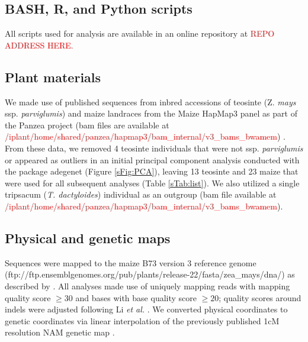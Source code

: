\documentclass{pnastwo}
\begin{document}
\begin{article}
\begin{materials}

  \subsection{BASH, R, and Python scripts}
All scripts used for analysis are available in an online repository at \textcolor{red}{REPO ADDRESS HERE.} 

\subsection{Plant materials}
We made use of published sequences from inbred accessions of teosinte (Z. \emph{mays} ssp. \emph{parviglumis}) and maize landraces from the Maize HapMap3 panel as part of the Panzea project (bam files are available at \textcolor{red}{/iplant/home/shared/panzea/hapmap3/bam\_internal/v3\_bams\_bwamem}) \cite{chia2012, lemmon2014,hapmap3}. 
From these data, we removed 4 teosinte individuals that were not ssp. \emph{parviglumis} or appeared as outliers in an initial principal component analysis conducted with the package adegenet \cite{jombart2011} (Figure \ref{sFig:PCA}), leaving 13 teosinte and 23 maize that were used for all subsequent analyses (Table \ref{sTab:list}). We also utilized a single tripsacum (\emph{T. dactyloides}) individual as an outgroup (bam file available at \textcolor{red}{/iplant/home/shared/panzea/hapmap3/bam\_internal/v3\_bams\_bwamem}).

\subsection{Physical and genetic maps}
Sequences were mapped to the maize B73 version 3 reference genome \cite{schnable2009} (ftp://ftp.ensemblgenomes.org/pub/plants/release-22/fasta/zea\_mays/dna/) as described by \cite{hapmap3}. All analyses made use of uniquely mapping reads with mapping quality score $\geq  30$ and bases with base quality score $\geq 20$; quality scores around indels were adjusted following Li \emph{et al.} \cite{li2011statistical}.
We converted physical coordinates to genetic coordinates via linear interpolation of the previously published 1cM resolution NAM genetic map \cite{glaubitz2014}. 


\end{materials}
\end{article}
\end{document}
